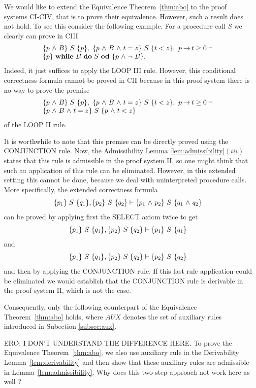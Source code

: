 \documentclass[runningheads]{llncs}       %
\newcommand{\AUX}{\mathit{AUX}}
\begin{document}
We would like to extend the Equivalence Theorem~\ref{thm:abo} to the
proof systems CI-CIV, that is to prove their equivalence.  However,
such a result does not hold.  To see this consider the following
example.  For a procedure call $S$ we clearly can prove in CIII
\[
  \begin{array}{l}
    \mbox{$\{{p \mbox{$\ \wedge\ $} B}\}\ {S}\ \{{p}\}$}, \ \mbox{$\{{p \mbox{$\ \wedge\ $} B \mbox{$\ \wedge\ $} t=z}\}\ {S}\ \{{t<z}\}$}, \ p \mbox{$\:\rightarrow\:$} t \geq 0 \vdash \\
    \mbox{$\{{p}\}\ {\mbox{$\mbox{{\bf while}\ } {B}\ \mbox{{\bf do}\ } {S}\ \mbox{{\bf od}}$}}\ \{{p \mbox{$\ \wedge\ $} \neg\ B}\}$}.
  \end{array}
\]
Indeed, it just suffices to apply the LOOP III rule.
However, this conditional correctness formula cannot be proved in CII
because in this proof system there is no way to prove the premise
\[
  \begin{array}{l}  
    \mbox{$\{{p \mbox{$\ \wedge\ $} B}\}\ {S}\ \{{p}\}$}, \ \mbox{$\{{p \mbox{$\ \wedge\ $} B \mbox{$\ \wedge\ $} t=z}\}\ {S}\ \{{t<z}\}$}, \ p \mbox{$\:\rightarrow\:$} t \geq 0 \vdash  \\
    \mbox{$\{{p \mbox{$\ \wedge\ $} B \mbox{$\ \wedge\ $} t=z}\}\ {S}\ \{{p \mbox{$\ \wedge\ $} t<z}\}$}
  \end{array}    
\]
of the LOOP II rule.

It is worthwhile to note that this premise can be directly proved
using the CONJUNCTION rule.  Now, the Admissibility Lemma
\ref{lem:admissibility}$(iii)$ states that this rule is admissible in
the proof system II, so one might think that such an application of
this rule can be eliminated.  However, in this extended setting this
cannot be done, because we deal with uninterpreted procedure calls.
More specifically, the extended correctness formula
\[
  \mbox{$\{{p_1}\}\ {S}\ \{{q_1}\}$}, \mbox{$\{{p_2}\}\ {S}\ \{{q_2}\}$}  \vdash \mbox{$\{{p_1 \mbox{$\ \wedge\ $} p_2}\}\ {S}\ \{{q_1 \mbox{$\ \wedge\ $} q_2}\}$}         
\]
can be proved by applying first the SELECT axiom twice to get 
\[
  \mbox{$\{{p_1}\}\ {S}\ \{{q_1}\}$}, \mbox{$\{{p_2}\}\ {S}\ \{{q_2}\}$}  \vdash \mbox{$\{{p_1}\}\ {S}\ \{{q_1}\}$} 
\]
and
\[
  \mbox{$\{{p_1}\}\ {S}\ \{{q_1}\}$}, \mbox{$\{{p_2}\}\ {S}\ \{{q_2}\}$}  \vdash \mbox{$\{{p_2}\}\ {S}\ \{{q_2}\}$}
\]
and then by applying the CONJUNCTION rule.  If this last rule
application could be eliminated we would establish that the
CONJUNCTION rule is derivable in the proof system II, which is not the
case.

Consequently, only the following counterpart of the Equivalence Theorem~\ref{thm:abo}
holds, where $\AUX$ denotes the set of auxiliary rules introduced in Subection \ref{subsec:aux}.

ERO: I DON'T UNDERSTAND THE DIFFERENCE HERE. To prove the Equivalence
Theorem~\ref{thm:abo}, we also use auxiliary rule in the Derivability
Lemma~\ref{lem:derivability} and then show that these auxiliary rules
are admissible in Lemma~\ref{lem:admissibility}.  Why does this
two-step approach not work here as well ?
\end{document}

